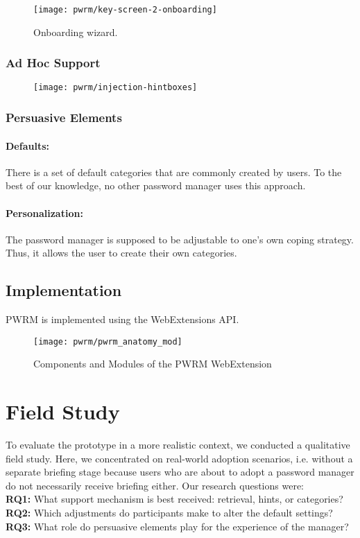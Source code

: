 \begin{figure}[htbp]
	\centering
	\texttt{[image: pwrm/key-screen-2-onboarding]}
	\caption{\label{fig:pwrm:key-screen-onboarding} Onboarding wizard.}
\end{figure}


\subsubsection{Ad Hoc Support}

\begin{figure}[htbp]
	\centering
	\texttt{[image: pwrm/injection-hintboxes]}
	\caption{\label{fig:pwrm:injection-hintboxes} }
\end{figure}


\subsubsection{Persuasive Elements}
\paragraph{Defaults:} There is a set of default categories that are commonly created by users. To the best of our knowledge, no other password manager uses this approach.


\paragraph{Personalization:} The password manager is supposed to be adjustable to one's own coping strategy. Thus, it allows the user to create their own categories. 




\subsection{Implementation}
PWRM is implemented using the WebExtensions API. 
\begin{figure}[htbp]
	\centering
	\texttt{[image: pwrm/pwrm\_anatomy\_mod]}
	\caption{\label{fig:pwrm:components} Components and Modules of the PWRM WebExtension}
\end{figure}


\section{Field Study}\label{sec:pwrm:field_study}
To evaluate the prototype in a more realistic context, we conducted a qualitative field study. Here, we concentrated on real-world adoption scenarios, i.e. without a separate briefing stage because users who are about to adopt a password manager do not necessarily receive briefing either. Our research questions were:\\
\noindent\textbf{RQ1:} What support mechanism is best received: retrieval, hints, or categories?\\
\noindent\textbf{RQ2:} Which adjustments do participants make to alter the default settings?
\noindent\textbf{RQ3:} What role do persuasive elements play for the experience of the manager?

